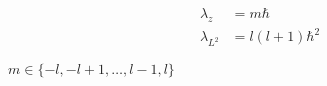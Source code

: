 

\vspace*{\fill}
\centering

\begin{align*}
    \lambda_{z} &= m\hbar \\
    \lambda_{L^2} &= l(l+1) \hbar^2
\end{align*}

$m \in \{ -l, -l+1, \ldots, l-1, l \} $

\centering
\vspace*{\fill}

